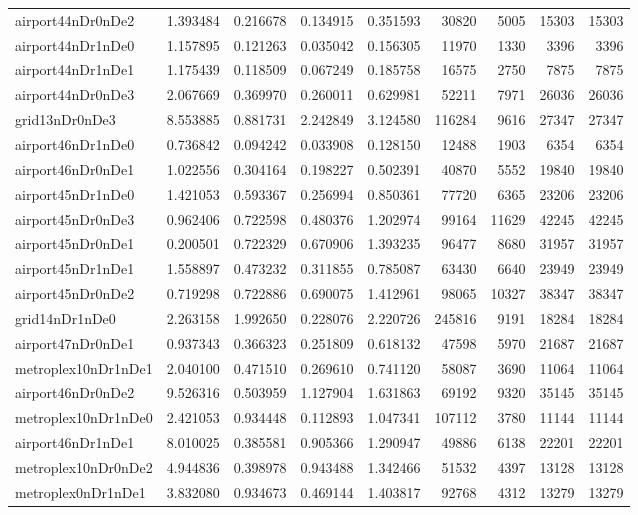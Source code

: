 \documentclass[../../../thesis.tex]{subfiles}
\begin{document}
\begin{longtable}{|l|r|r|r|r|r|r|r|r|}
airport44nDr0nDe2 & 1.393484 & 0.216678 & 0.134915 & 0.351593 & 30820 & 5005 & 15303 & 15303 \\
airport44nDr1nDe0 & 1.157895 & 0.121263 & 0.035042 & 0.156305 & 11970 & 1330 & 3396 & 3396 \\
airport44nDr1nDe1 & 1.175439 & 0.118509 & 0.067249 & 0.185758 & 16575 & 2750 & 7875 & 7875 \\
airport44nDr0nDe3 & 2.067669 & 0.369970 & 0.260011 & 0.629981 & 52211 & 7971 & 26036 & 26036 \\
grid13nDr0nDe3 & 8.553885 & 0.881731 & 2.242849 & 3.124580 & 116284 & 9616 & 27347 & 27347 \\
airport46nDr1nDe0 & 0.736842 & 0.094242 & 0.033908 & 0.128150 & 12488 & 1903 & 6354 & 6354 \\
airport46nDr0nDe1 & 1.022556 & 0.304164 & 0.198227 & 0.502391 & 40870 & 5552 & 19840 & 19840 \\
airport45nDr1nDe0 & 1.421053 & 0.593367 & 0.256994 & 0.850361 & 77720 & 6365 & 23206 & 23206 \\
airport45nDr0nDe3 & 0.962406 & 0.722598 & 0.480376 & 1.202974 & 99164 & 11629 & 42245 & 42245 \\
airport45nDr0nDe1 & 0.200501 & 0.722329 & 0.670906 & 1.393235 & 96477 & 8680 & 31957 & 31957 \\
airport45nDr1nDe1 & 1.558897 & 0.473232 & 0.311855 & 0.785087 & 63430 & 6640 & 23949 & 23949 \\
airport45nDr0nDe2 & 0.719298 & 0.722886 & 0.690075 & 1.412961 & 98065 & 10327 & 38347 & 38347 \\
grid14nDr1nDe0 & 2.263158 & 1.992650 & 0.228076 & 2.220726 & 245816 & 9191 & 18284 & 18284 \\
airport47nDr0nDe1 & 0.937343 & 0.366323 & 0.251809 & 0.618132 & 47598 & 5970 & 21687 & 21687 \\
metroplex10nDr1nDe1 & 2.040100 & 0.471510 & 0.269610 & 0.741120 & 58087 & 3690 & 11064 & 11064 \\
airport46nDr0nDe2 & 9.526316 & 0.503959 & 1.127904 & 1.631863 & 69192 & 9320 & 35145 & 35145 \\
metroplex10nDr1nDe0 & 2.421053 & 0.934448 & 0.112893 & 1.047341 & 107112 & 3780 & 11144 & 11144 \\
airport46nDr1nDe1 & 8.010025 & 0.385581 & 0.905366 & 1.290947 & 49886 & 6138 & 22201 & 22201 \\
metroplex10nDr0nDe2 & 4.944836 & 0.398978 & 0.943488 & 1.342466 & 51532 & 4397 & 13128 & 13128 \\
metroplex0nDr1nDe1 & 3.832080 & 0.934673 & 0.469144 & 1.403817 & 92768 & 4312 & 13279 & 13279 \\

\end{longtable}
\end{document}
